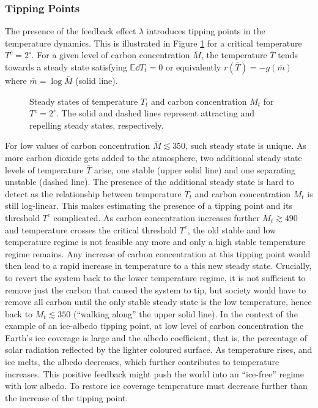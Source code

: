 \documentclass[../../main.tex]{subfiles}
\begin{document}
\subsubsection{Tipping Points}

The presence of the feedback effect $\lambda$ introduces tipping points in the temperature dynamics. This is illustrated in Figure \ref{fig:bare-nullclines} for a critical temperature $T^c = 2^\circ$. For a given level of carbon concentration $\bar{M}$, the temperature $\bar{T}$ tends towards a steady state satisfying $\mathbb{E} \dd{T}_t = 0$ or equivalently $r(\bar{T}) = - g(\bar{m})$ where $\bar{m} = \log \bar{M}$ (solid line). \begin{figure}[htbp]
    \centering
    
    \caption{Steady states of temperature $T_t$ and carbon concentration $M_t$ for $T^c = 2^\circ$. The solid and dashed lines represent attracting and repelling steady states, respectively.}
    \label{fig:bare-nullclines}
\end{figure} \noindent For low values of carbon concentration $\bar{M} \lesssim 350$, such steady state is unique. As more carbon dioxide gets added to the atmosphere, two additional steady state levels of temperature $\bar{T}$ arise, one stable (upper solid line) and one separating unstable (dashed line). The presence of the additional steady state is hard to detect as the relationship between temperature $T_t$ and carbon concentration $M_t$ is still log-linear. This makes estimating the presence of a tipping point and its threshold $T^c$ complicated. As carbon concentration increases further $M_t \gtrsim 490$ and temperature crosses the critical threshold $T^c$, the old stable and low temperature regime is not feasible any more and only a high stable temperature regime remains. Any increase of carbon concentration at this tipping point would then lead to a rapid increase in temperature to a this new steady state. Crucially, to revert the system back to the lower temperature regime, it is not sufficient to remove just the carbon that caused the system to tip, but society would have to remove all carbon until the only stable steady state is the low temperature, hence back to $M_t \lesssim 350$ (``walking along'' the upper solid line). In the context of the example of an ice-albedo tipping point, at low level of carbon concentration the Earth's ice coverage is large and the albedo coefficient, that is, the percentage of solar radiation reflected by the lighter coloured surface. As temperature rises, and ice melts, the albedo decreases, which further contributes to temperature increases. This positive feedback might push the world into an ``ice-free'' regime with low albedo. To restore ice coverage temperature must decrease further than the increase of the tipping point.
\end{document}
